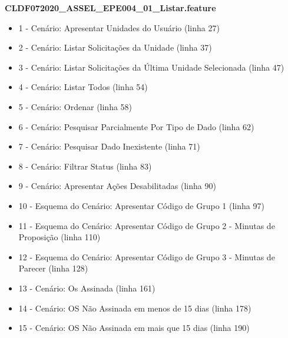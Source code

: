 \textbf{CLDF072020\_ASSEL\_EPE004\_01\_Listar.feature}
\begin{itemize}
	\item 1 - Cenário: Apresentar Unidades do Usuário (linha 27)
	\item 2 - Cenário: Listar Solicitações da Unidade (linha 37)
	\item 3 - Cenário: Listar Solicitações da Última Unidade Selecionada (linha 47)
	\item 4 - Cenário: Listar Todos (linha 54)
	\item 5 - Cenário: Ordenar (linha 58)
	\item 6 - Cenário: Pesquisar Parcialmente Por Tipo de Dado (linha 62)
	\item 7 - Cenário: Pesquisar Dado Inexistente (linha 71)
	\item 8 - Cenário: Filtrar Status (linha 83)
	\item 9 - Cenário: Apresentar Ações Desabilitadas (linha 90)
	\item 10 - Esquema do Cenário: Apresentar Código de Grupo 1 (linha 97)
	\item 11 - Esquema do Cenário: Apresentar Código de Grupo 2 - Minutas de Proposição (linha 110)
	\item 12 - Esquema do Cenário: Apresentar Código de Grupo 3 - Minutas de Parecer (linha 128)
	\item 13 - Cenário: Os Assinada (linha 161)
	\item 14 - Cenário: OS Não Assinada em menos de 15 dias (linha 178)
	\item 15 - Cenário: OS Não Assinada em mais que 15 dias (linha 190)
\end{itemize}

